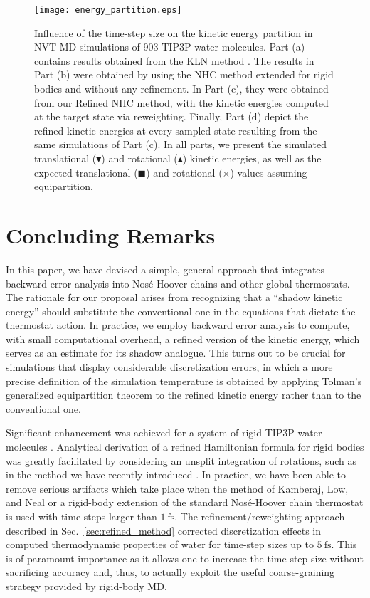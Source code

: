 \documentclass[
	aip,
	jcp,
	reprint,
]{revtex4-1}
\begin{document}
\begin{figure*}
	\texttt{[image: energy\_partition.eps]}
		\caption{Influence of the time-step size on the kinetic energy partition in NVT-MD simulations of 903 TIP3P \cite{Jorgensen_1983} water molecules.
		Part (a) contains results obtained from the KLN method \cite{Kamberaj_2005}.
		The results in Part (b) were obtained by using the NHC method \cite{Martyna_1996} extended for rigid bodies and without any refinement.
		In Part (c), they  were obtained from our Refined NHC \cite{Martyna_1996} method, with the kinetic energies computed at the target state via reweighting.
		Finally, Part (d) depict the refined kinetic energies at every sampled state resulting from the same simulations of Part (c).
		In all parts, we present the simulated translational ($\blacktriangledown$) and rotational ($\blacktriangle$) kinetic energies, as well as the expected translational ($\blacksquare$) and rotational ($\times$) values assuming equipartition.}
	\label{fig:energy_partition}
\end{figure*}

\section{Concluding Remarks}
\label{sec:conclusion}

In this paper, we have devised a simple, general approach that integrates backward error analysis into Nos\'{e}-Hoover chains and other global thermostats.
The rationale for our proposal arises from recognizing that a ``shadow kinetic energy'' should substitute the conventional one in the equations that dictate the thermostat action.
In practice, we employ backward error analysis to compute, with small computational overhead, a refined version of the kinetic energy, which serves as an estimate for its shadow analogue.
This turns out to be crucial for simulations that display considerable discretization errors, in which a more precise definition of the simulation temperature \cite{Eastwood_2010} is obtained by applying Tolman's generalized equipartition theorem to the refined kinetic energy rather than to the conventional one.

Significant enhancement was achieved for a system of rigid TIP3P-water molecules \cite{Jorgensen_1983}.
Analytical derivation of a refined Hamiltonian formula for rigid bodies was greatly facilitated by considering an unsplit integration of rotations, such as in the method we have recently introduced \cite{Silveira_2017}.
In practice, we have been able to remove serious artifacts which take place when the method of Kamberaj, Low, and Neal \cite{Kamberaj_2005} or a rigid-body extension of the standard Nos\'{e}-Hoover chain thermostat \cite{Martyna_1992, Martyna_1996} is used with time steps larger than $1~\text{fs}$.
The refinement/reweighting approach described in Sec.~\ref{sec:refined_method} corrected discretization effects in computed thermodynamic properties of water for time-step sizes up to $5~\text{fs}$. This is of paramount importance as it allows one to increase the time-step size without sacrificing accuracy and, thus, to actually exploit the useful coarse-graining strategy provided by rigid-body MD.
\end{document}

